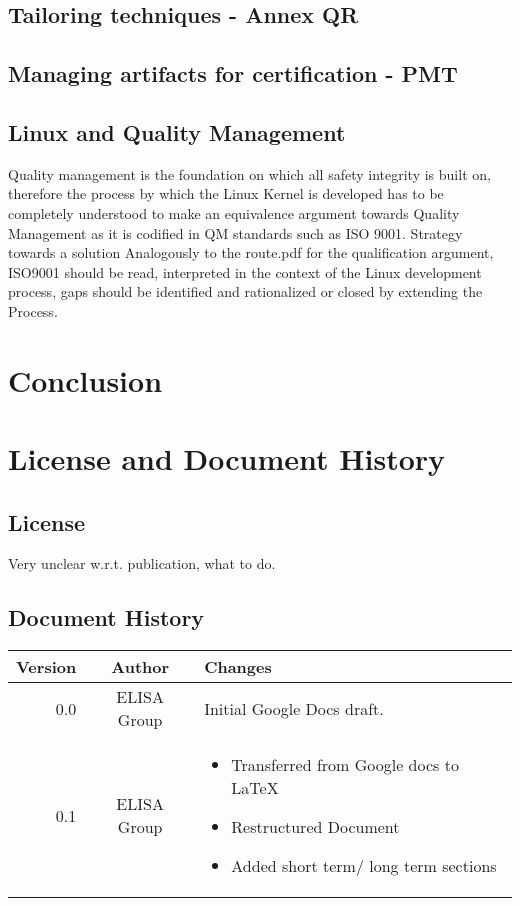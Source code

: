 \documentclass[12pt]{ElisaPaper}
\begin{document}
\subsection{Tailoring techniques - Annex QR}


\subsection{Managing artifacts for certification - PMT}



\subsection{Linux and Quality Management}
Quality management is the foundation on which all safety integrity is built on, therefore the process by which the Linux Kernel is developed has to be completely understood to make an equivalence argument towards Quality Management as it is codified in QM standards such as ISO 9001.
Strategy towards a solution
Analogously to the route.pdf for the qualification argument, ISO9001 should be read, interpreted in the context of the Linux development process, gaps should be identified and rationalized or closed by extending the Process.

\section{Conclusion}

\section{License and Document History}
\subsection{License}
Very unclear w.r.t. publication, what to do.

\subsection{Document History}

\begin{tabular}{r|c|p{}} 
Version & Author & Changes \\
\hline
0.0 & ELISA Group & Initial Google Docs draft. \\
0.1 & ELISA Group & \begin{itemize}
	\item Transferred from Google docs to  \LaTeX
	\item Restructured Document 
	\item Added short term/ long term sections 
\end{itemize}	
\end{tabular} 	


{}

	
	
	
\end{document}
